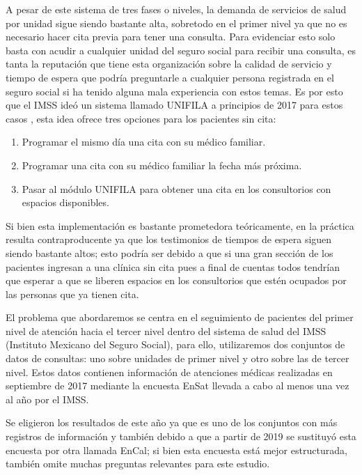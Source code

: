 \documentclass[10pt]{article}
\begin{document}
    A pesar de este sistema de tres fases o niveles, la demanda de servicios de salud por unidad sigue siendo bastante alta, sobretodo en el primer nivel ya que no es necesario hacer cita previa para tener una consulta. Para evidenciar esto solo basta con acudir a cualquier unidad del seguro social para recibir una consulta, es tanta la reputación que tiene esta organización sobre la calidad de servicio y tiempo de espera que podría preguntarle a cualquier persona registrada en el seguro social si ha tenido alguna mala experiencia con estos temas. Es por esto que el IMSS ideó un sistema llamado UNIFILA a principios de 2017 para estos casos \cite{UNIFILA}, esta idea ofrece tres opciones para los pacientes sin cita:
    \begin{enumerate}
    	\item Programar el mismo día una cita con su médico familiar.
    	\item Programar una cita con su médico familiar la fecha más próxima.
    	\item Pasar al módulo UNIFILA para obtener una cita en los consultorios con espacios disponibles.
    \end{enumerate}
    
    Si bien esta implementación es bastante prometedora teóricamente, en la práctica resulta contraproducente ya que los testimonios de tiempos de espera siguen siendo bastante altos; esto podría ser debido a que si una gran sección de los pacientes ingresan a una clínica sin cita pues a final de cuentas todos tendrían que esperar a que se liberen espacios en los consultorios que estén ocupados por las personas que ya tienen cita.
    
    El problema que abordaremos se centra en el seguimiento de pacientes del primer nivel de atención hacia el tercer nivel dentro del sistema de salud del IMSS (Instituto Mexicano del Seguro Social), para ello, utilizaremos dos conjuntos de datos de consultas: uno sobre unidades de primer nivel y otro sobre las de tercer nivel. Estos datos contienen información de atenciones médicas realizadas en septiembre de 2017 mediante la encuesta EnSat \cite{ensat2017} llevada a cabo al menos una vez al año por el IMSS.
    
    Se eligieron los resultados de este año ya que es uno de los conjuntos con más registros de información y también debido a que a partir de 2019 se sustituyó esta encuesta por otra llamada EnCal; si bien esta encuesta está mejor estructurada, también omite muchas preguntas relevantes para este estudio.
    
\end{document}
